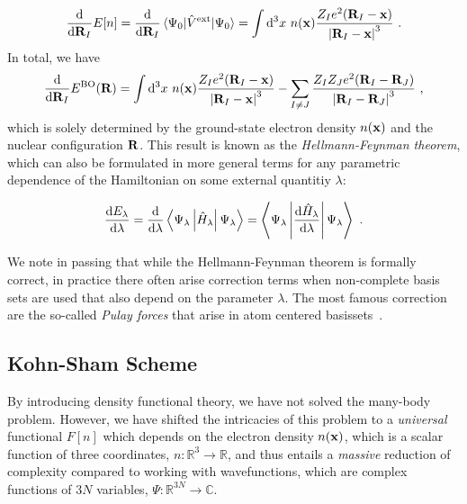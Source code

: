 \begin{align}
	\frac{{\rm d}}{{\rm d} {\bf R}_I} E[n]
		= \frac{{\rm d}}{{\rm d} {\bf R}_I} \braket{\Psi_0 | \hat V ^{\rm ext} | \Psi_0} 
		= \int {\rm d}^3 x ~ n({\bf x}) \frac{Z_I e^2 ({\bf R}_I - {\bf x})}{\left\lvert {\bf R}_I - {\bf x} \right\rvert^3}~.
\end{align}
In total, we have
\begin{align}
	\frac{{\rm d}}{{\rm d} {\bf R}_I} E^{\rm BO} ({\bf R})
	= \int {\rm d}^3 x ~ n({\bf x}) \frac{Z_I e^2 ({\bf R}_I - {\bf x})}{\left\lvert {\bf R}_I - {\bf x} \right\rvert^3}
	- \sum_{I \neq J} \frac{Z_I Z_J e^2 ({{\bf R}}_{I}-{\bf R}_{J})}{
		\left\lvert {\bf R}_{I}-{\bf R}_{J} \right\rvert^3}~,
	\label{eq:hellmannfeynman.force}
\end{align}
which is solely determined by the ground-state electron density $n ({\bf x})$ and the nuclear configuration $\bf R$. This result is known as the \emph{Hellmann-Feynman theorem}, which can also be formulated in more general terms for any parametric dependence of the Hamiltonian on some external quantitiy $\lambda$:
\begin{theorem}
\begin{align}
	\frac{{\rm d} E_{\lambda}}{{\rm d} \lambda}
		= \frac{{\rm d}}{{\rm d} \lambda}\left\langle\Psi_{\lambda} \left|\hat{H}_{\lambda}\right| \Psi_{\lambda} \right\rangle
		= \left\langle\Psi_{\lambda} \left| \frac{{\rm d} \hat{H}_{\lambda}}{{\rm d} \lambda} \right| \Psi_{\lambda} \right\rangle~.
\end{align}
\end{theorem}
We note in passing that while the Hellmann-Feynman theorem is formally correct, in practice there often arise correction terms when non-complete basis sets are used that also depend on the parameter $\lambda$. The most famous correction are the so-called \emph{Pulay forces} that arise in atom centered basissets~.

\subsection{Kohn-Sham Scheme}
By introducing density functional theory, we have not solved the many-body problem. However, we have shifted the intricacies of this problem to a \emph{universal} functional $F[n]$ which depends on the electron density $n({\bf x})$, which is a scalar function of three coordinates, $n: \mathds R^3 \rightarrow \mathds R$, and thus entails a \emph{massive} reduction of complexity compared to working with wavefunctions, which are complex functions of $3N$ variables, $\Psi: \mathds R^{3N} \rightarrow \mathds C$.

